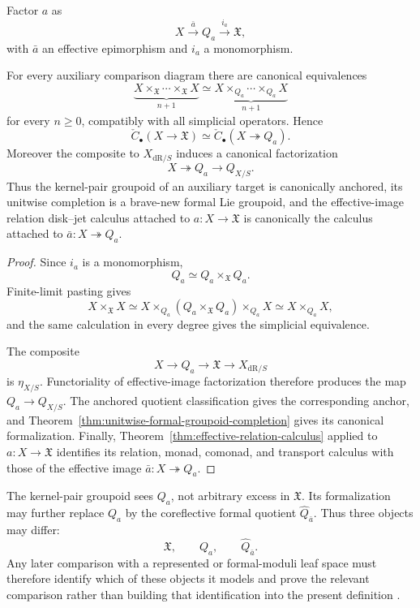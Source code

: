 Factor $a$ as
\[
    X
    \xrightarrow{\bar a}
    Q_a
    \xrightarrow{i_a}
    \mathfrak X,
\]
with $\bar a$ an effective epimorphism and $i_a$ a monomorphism.

\begin{proposition}
\label{prop:kernel-pair-image-invariance}
For every auxiliary comparison diagram there are canonical equivalences
\[
    \underbrace{
    X\times_{\mathfrak X}\cdots\times_{\mathfrak X}X
    }_{n+1}
    \simeq
    \underbrace{
    X\times_{Q_a}\cdots\times_{Q_a}X
    }_{n+1}
\]
for every $n\ge0$, compatibly with all simplicial operators.  Hence
\[
    \check C_\bullet(X\to\mathfrak X)
    \simeq
    \check C_\bullet(X\twoheadrightarrow Q_a).
\]
Moreover the composite to $X_{\mathrm{dR}/S}$ induces a canonical factorization
\[
    X\twoheadrightarrow Q_a\longrightarrow Q_{X/S}.
\]
Thus the kernel-pair groupoid of an auxiliary target is canonically anchored,
its unitwise completion is a brave-new formal Lie groupoid, and the
effective-image relation disk--jet calculus attached to
$a:X\to\mathfrak X$ is canonically the calculus attached to
$\bar a:X\twoheadrightarrow Q_a$.
\end{proposition}

\begin{proof}
Since $i_a$ is a monomorphism,
\[
    Q_a\simeq Q_a\times_{\mathfrak X}Q_a.
\]
Finite-limit pasting gives
\[
    X\times_{\mathfrak X}X
    \simeq
    X\times_{Q_a}
    \left(
        Q_a\times_{\mathfrak X}Q_a
    \right)
    \times_{Q_a}X
    \simeq
    X\times_{Q_a}X,
\]
and the same calculation in every degree gives the simplicial equivalence.

The composite
\[
    X\to Q_a\to\mathfrak X\to X_{\mathrm{dR}/S}
\]
is $\eta_{X/S}$.  Functoriality of effective-image factorization therefore
produces the map $Q_a\to Q_{X/S}$.  The anchored quotient classification
gives the corresponding anchor, and
Theorem~\ref{thm:unitwise-formal-groupoid-completion} gives its canonical
formalization.  Finally,
Theorem~\ref{thm:effective-relation-calculus} applied to
$a:X\to\mathfrak X$ identifies its relation, monad, comonad, and transport
calculus with those of the effective image
$\bar a:X\twoheadrightarrow Q_a$.
\end{proof}

\begin{remark}
\label{rem:effective-full-leaf}
The kernel-pair groupoid sees $Q_a$, not arbitrary excess in
$\mathfrak X$.  Its formalization may further replace $Q_a$ by the
coreflective formal quotient $\widehat Q_{\bar a}$.  Thus three objects may
differ:
\[
    \mathfrak X,
    \qquad
    Q_a,
    \qquad
    \widehat Q_{\bar a}.
\]
Any later comparison with a represented or formal-moduli leaf space must
therefore identify which of these objects it models and prove the relevant
comparison rather than building that identification into the present
definition \cite{Nuiten2019,BrantnerMagidsonNuiten2025}.
\end{remark}


